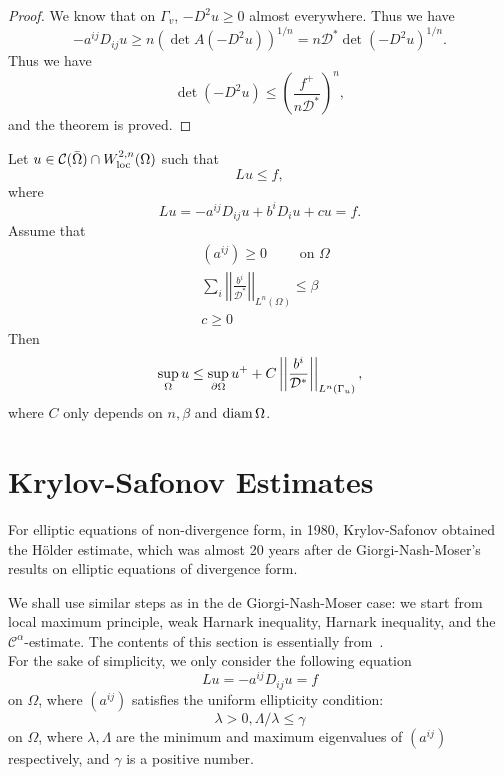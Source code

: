 \begin{proof} We know that on $\Gamma_v$, $-D^2 u\geq 0$ almost everywhere. Thus we have
\[
-a^{ij}D_{ij} u\geq n(\det A(-D^2u))^{1/n}=n\mathcal D^*\det (-D^2 u)^{1/n}.
\]
Thus we have
\[
\det(-D^2 u)\leq\left(\frac{f^+}{n\mathcal D^*}\right)^n,
\]
and the theorem is proved.

\end{proof}

\begin{theorem} Let $u\in \mathcal C(\bar\Omega)\cap W_{{\rm loc}}^{2,n}(\Omega)$ 
such that
\[
Lu\leq f,
\]
where
\[
Lu=-a^{ij}D_{ij} u+b^i D_i u+cu=f.
\]
Assume that 
\begin{align*}
& (a^{ij})\geq 0\qquad \text{ on } \Omega\\
&\sum_i\left|\left|\frac{b^i}{\mathcal D^*}\right|\right|_{L^n(\Omega)}\leq\beta\\
& c\geq 0
\end{align*}
Then
\[
\sup_\Omega u\leq\sup_{\partial\Omega} u^++C\left|\left|\frac{b^i}{\mathcal D^*}\right|\right|_{L^n(\Gamma_u)},
\]
where $C$ only depends on $n,\beta$ and ${\rm diam}\,\Omega$.
\end{theorem}



\section{Krylov-Safonov Estimates}
For elliptic equations of non-divergence form, in 1980, Krylov-Safonov obtained the H\"older estimate, which was almost 20 years after de Giorgi-Nash-Moser's results on elliptic equations of divergence form.

We shall use similar steps as in the de Giorgi-Nash-Moser case: we start from local maximum principle, weak Harnark inequality,  Harnark inequality, and the $\mathcal C^\alpha$-estimate. The contents of this section is essentially from~\cite{chen}.\\

For the sake of simplicity, we only consider  the following equation
\begin{equation}\label{div-2}
Lu=-a^{ij} D_{ij} u=f
\end{equation}
on $\Omega$, where $(a^{ij})$ satisfies the uniform ellipticity condition:
\begin{equation}\label{uni-4}
\lambda>0, \Lambda/\lambda\leq\gamma
\end{equation}
on $\Omega$, where $\lambda, \Lambda$ are the minimum and maximum eigenvalues of $(a^{ij})$
respectively, and $\gamma$ is a positive number.


